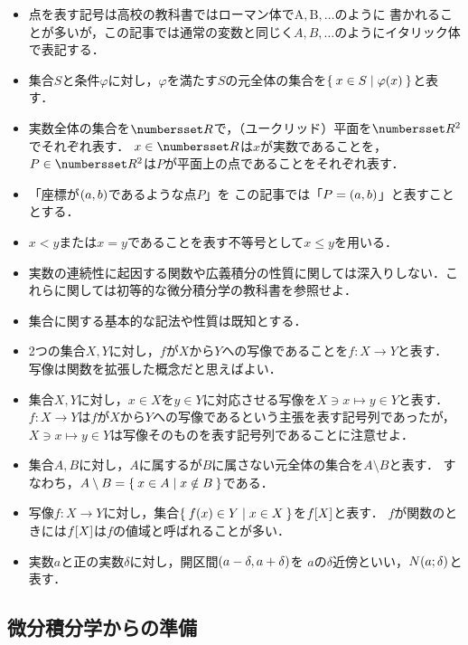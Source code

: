 \documentclass[11pt,a4paper]{ltjsarticle}
\newcommand*{\coord}[1]{\paren{#1}}
\newcommand*{\image}[2]{#1 \sqbracket*{#2}}
\newcommand*{\neighbourfood}[2]{\apply{N}{{#1};{#2}}}
\theoremstyle{definition}
\begin{document}
\begin{itemize}
  \item 点を表す記号は高校の教科書ではローマン体で$\mathrm{A}, \mathrm{B}, \dotsc$のように
    書かれることが多いが，この記事では通常の変数と同じく$A,B, \dotsc$のようにイタリック体で表記する．
  \item 集合$S$と条件$\varphi$に対し，$\varphi$を満たす$S$の元全体の集合を$\setintension{x \in S}{\apply{\varphi}{x}}$と表す．
  \item 実数全体の集合を$\Real$で，（ユークリッド）平面を$\Real ^2$でそれぞれ表す．
    $x \in \Real$は$x$が実数であることを，$P \in \Real ^2$は$P$が平面上の点であることをそれぞれ表す．
  \item 「座標が$\coord{a,b}$であるような点$P$」を
    この記事では「$P = \coord{a,b}$」と表すこととする．
  \item $x < y$または$x = y$であることを表す不等号として$x \leq y$を用いる．
  \item 実数の連続性に起因する関数や広義積分の性質に関しては深入りしない．これらに関しては初等的な微分積分学の教科書を参照せよ．
  \item 集合に関する基本的な記法や性質は既知とする．
  \item 2つの集合$X,Y$に対し，$f$が$X$から$Y$への写像であることを$f \colon X \to Y$と表す．
    写像は関数を拡張した概念だと思えばよい．
  \item 集合$X, Y$に対し，$x \in X$を$y \in Y$に対応させる写像を$X \ni x \mapsto y \in Y$と表す．
    $f \colon X \to Y$は$f$が$X$から$Y$への写像であるという主張を表す記号列であったが，
    $X \ni x \mapsto y \in Y$は写像そのものを表す記号列であることに注意せよ．
  \item 集合$A,B$に対し，$A$に属するが$B$に属さない元全体の集合を$A \setminus B$と表す．
    すなわち，$A \setminus B = \Set{x \in A |x \notin B}$である．
  \item 写像$f \colon X \to Y$に対し，集合$\setintension{\apply{f}{x} \in Y}{x \in X}$を$\image{f}{X}$と表す．
    $f$が関数のときには$\image{f}{X}$は$f$の値域と呼ばれることが多い．
  \item 実数$a$と正の実数$\delta$に対し，開区間$\interval{op}{a - \delta, a + \delta}$を
    $a$の$\delta$近傍といい，$\neighbourfood{a}{\delta}$と表す．
\end{itemize}

\subsection{微分積分学からの準備} \label{subsec:calculus}
\end{document}
